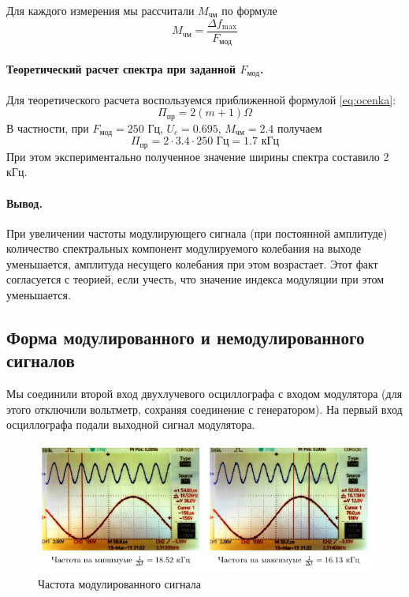 \documentclass[a4paper,12pt]{article}
\begin{document}
Для каждого измерения мы рассчитали $M_\text{чм}$ по формуле
\begin{equation}
	M_\text{чм}=\frac{\Delta f_\text{max}}{F_\text{мод}}
\end{equation}

\paragraph{Теоретический расчет спектра при заданной $F_\text{мод}$.} Для теоретического расчета воспользуемся приближенной формулой \eqref{eq:ocenka}:
\begin{equation}
	\Pi_\text{пр}=2(m+1)\Omega
\end{equation}
В частности, при $F_{\text{мод}}=250\text{ Гц}$, $U_c=0.695$, $M_{\text{чм}}=2.4$  получаем
\begin{equation}
	\Pi_\text{пр}=2\cdot3.4\cdot250 \text{ Гц}=1.7 \text{ кГц}
\end{equation}
При этом экспериментально полученное значение ширины спектра составило 2 кГц.
\paragraph{Вывод.}
При увеличении частоты модулирующего сигнала (при постоянной амплитуде) количество спектральных компонент модулируемого колебания на выходе уменьшается, амплитуда несущего колебания при этом возрастает. Этот факт согласуется с теорией, если учесть, что значение индекса модуляции при этом уменьшается.

\subsection{Форма модулированного и немодулированного сигналов}

Мы соединили второй вход двухлучевого осциллографа с входом модулятора (для этого отключили вольтметр, сохраняя соединение с генератором). На первый вход осциллографа подали выходной сигнал модулятора.

\begin{figure}[H]
	\centering
	\includegraphics[width=\textwidth]{plot/mod}
	\vspace{-2em}
	\caption{Частота модулированного сигнала}
	\label{fig:figure4}
\end{figure}
\end{document}
